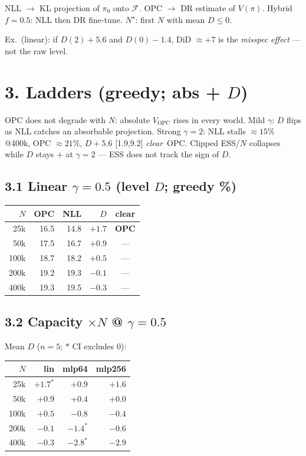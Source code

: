 \documentclass[11pt]{article}
\newcommand{\phonesection}[1]{\Needspace{7\baselineskip}\section*{#1}}
\newcommand{\phonesub}[1]{\Needspace{5\baselineskip}\subsection*{#1}}
\newcommand{\clearwin}{\emph{clear}}
\begin{document}
NLL \(\to\) KL projection of \(\pi_0\) onto
\(\mathcal{F}\).
OPC \(\to\) DR estimate of \(V(\pi)\).
Hybrid \(f{=}0.5\): NLL then DR fine-tune.
\(N^\star\): first \(N\) with mean \(D\le 0\).

Ex.\ (linear): if \(D(2){+}5.6\) and
\(D(0){-}1.4\), DiD \(\approx{+}7\) is the
\emph{misspec effect} --- not the raw level.

\phonesection{3. Ladders (greedy; abs + \(D\))}

OPC does not degrade with \(N\): absolute
\(V_{\mathrm{OPC}}\) rises in every world.
Mild \(\gamma\): \(D\) flips as NLL catches an
absorbable projection. Strong \(\gamma{=}2\):
NLL stalls \(\approx 15\%\) @400k, OPC
\(\approx 21\%\), \(D{+}5.6\) [1.9,9.2]
\clearwin\ OPC. Clipped ESS/\(N\) collapses
while \(D\) stays \(+\) at \(\gamma{=}2\) --- ESS
does not track the sign of \(D\).

\phonesub{3.1 Linear \(\gamma{=}0.5\) (level \(D\); greedy \%)}
{\scriptsize
\begin{tabular}{@{}r rrr c@{}}
\toprule
\(N\) & OPC & NLL & \(D\) & clear \\
\midrule
25k & 16.5 & 14.8 & \(+1.7\) & \textbf{OPC} \\
50k & 17.5 & 16.7 & \(+0.9\) & --- \\
100k & 18.7 & 18.2 & \(+0.5\) & --- \\
200k & 19.2 & 19.3 & \(-0.1\) & --- \\
400k & 19.3 & 19.5 & \(-0.3\) & --- \\
\bottomrule
\end{tabular}}

\phonesub{3.2 Capacity \(\times N\) @ \(\gamma{=}0.5\)}
Mean \(D\) (\(n{=}5\); \(*\) CI excludes 0):

{\scriptsize
\begin{tabular}{@{}r rrr@{}}
\toprule
\(N\) & lin & mlp64 & mlp256 \\
\midrule
25k & \(+1.7^*\) & \(+0.9\) & \(+1.6\) \\
50k & \(+0.9\) & \(+0.4\) & \(+0.0\) \\
100k & \(+0.5\) & \(-0.8\) & \(-0.4\) \\
200k & \(-0.1\) & \(-1.4^*\) & \(-0.6\) \\
400k & \(-0.3\) & \(-2.8^*\) & \(-2.9\) \\
\bottomrule
\end{tabular}}
\end{document}
